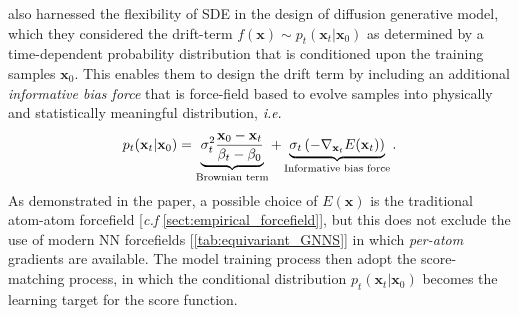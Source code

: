 \citet{wu2022diffusion} also harnessed the flexibility of SDE in the design of diffusion generative model, which they considered the drift-term $f(\bm{x})\sim p_t(\bm{x}_t|\bm{x}_0)$ as determined by a time-dependent probability distribution that is conditioned upon the training samples $\bm{x}_0$. This enables them to design the drift term by including an additional \emph{informative bias force} that is force-field based to evolve samples into physically and statistically meaningful distribution, $\emph{i.e.}$
\begin{equation*}
    p_t(\mathbf{x}_t|\mathbf{x}_0)=\underbrace{\sigma_t^2\frac{\mathbf{x}_0-\mathbf{x}_t}{\beta_t-\beta_0}}_{\mbox{\scriptsize{Brownian term}}}+\underbrace{\sigma_t\left(-\nabla_{\mathbf{x}_t}E(\mathbf{x}_t)\right)}_{\mbox{\scriptsize{Informative bias force}}}.
\end{equation*}
As demonstrated in the paper, a possible choice of $E(\bm{x})$ is the traditional atom-atom forcefield [\emph{c.f} \cref{sect:empirical_forcefield}], but this does not exclude the use of modern NN forcefields [\cref{tab:equivariant_GNNS}] in which \emph{per-atom} gradients are available. The model training process then adopt the score-matching process, in which the conditional distribution $p_t(\bm{x}_t|\bm{x}_0)$ becomes the learning target for the score function. 


